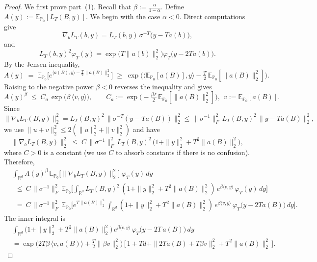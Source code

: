 \documentclass[10pt,a4paper]{amsart}
\newcommand{\E}{\mathbb{E}}
\newcommand{\R}{\mathbb{R}}
\begin{document}
\begin{proof}
We first prove part~(1). Recall that $\beta:=\frac{\alpha}{1-\alpha}.$
Define $A(y):=\E_{\mathbb P_0}[L_T(B,y)].$
We begin with the case $\alpha<0$.
Direct computations give
\[
\nabla_b L_T(b,y)
=
L_T(b,y)\,\sigma^{-T}\!\bigl(y-Ta(b)\bigr),
\]
and
\[
L_T(b,y)^2\varphi_T(y)
=
\exp\!\bigl(T\|a(b)\|_2^2\bigr)
\varphi_T\!\bigl(y-2Ta(b)\bigr).
\]
By the Jensen inequality,
\[
A(y) \;=\; \E_{\mathbb{P}_0}\big[e^{\langle a(B),y\rangle-\frac{T}{2}\|a(B)\|_2^2}\big]
\;\ge\;
\exp\!\Big( \langle \E_{\mathbb{P}_0}[a(B)],y\rangle - \tfrac{T}{2}\,\E_{\mathbb{P}_0}\left[\|a(B)\|_2^2\right] \Big).
\]
Raising to the negative power $\beta<0$ reverses the inequality and gives
\begin{equation}\label{eq:est_A_beta}
A(y)^{\beta}\;\le\;C_a\,\exp\!\big(\beta\,\langle v,y\rangle\big),
\qquad
C_a:=\exp\!\Big(-\tfrac{\beta T}{2}\,\E_{\mathbb{P}_0}\left[\|a(B)\|_2^2\right]\Big),\ \ 
v:=\E_{\mathbb{P}_0}[a(B)].
\end{equation}
Since
\[
\|\nabla_b L_T(B,y)\|_2^2
= L_T(B,y)^2\,\|\sigma^{-T}(y-T a(B))\|_{2}^2
\le \,\|\sigma^{-1}\|_F^2\,L_T(B,y)^2\,\|y-T a(B)\|_2^2,
\] 
we use $\|u+v\|_2^2\le 2(\|u\|_2^2+\|v\|_2^2)$ and have %
\begin{equation*}
\|\nabla_b L_T(B,y)\|_2^2
\;\le\; C\,\|\sigma^{-1}\|_F^2\,L_T(B,y)^2\,\big(1+\|y\|_2^2+T^2\|a(B)\|_2^2\big),
\end{equation*}where $C > 0$ is a constant (we use $C$ to absorb constants if there is no confusion). Therefore,
\[
\begin{aligned}
&\int_{\R^d} A(y)^{\beta}\,\E_{\mathbb{P}_0}\big[\|\nabla_b L_T(B,y)\|_2^2\big]\;\varphi_T(y)\,dy \\
&\ \ \le\ C\,\|\sigma^{-1}\|_F^2\,\E_{\mathbb{P}_0}\!\Big[\int_{\R^d} L_T(B,y)^2\,(1+\|y\|_2^2+T^2\|a(B)\|_2^2)\,e^{\beta\langle v,y\rangle}\,\varphi_T(y)\,dy\Big]\\
&\ \ =\ C\,\|\sigma^{-1}\|_F^2\,\E_{\mathbb{P}_0}\!\Big[e^{T\|a(B)\|_2^2}
\int_{\R^d} (1+\|y\|_2^2+T^2\|a(B)\|_2^2)\,e^{\beta\langle v,y\rangle}\,\varphi_T\!\big(y-2T a(B)\big)\,dy\Big].
\end{aligned}
\]
The inner integral is 
\begin{align*}
    &\int_{\mathbb{R}^d} \bigl(1+\|y\|_2^{2}+T^{2}\|a(B)\|_2^{2}\bigr)\,
e^{\beta\langle v,y\rangle}\,
\varphi_{T}\bigl(y-2T\,a(B)\bigr)\,dy\\
&=
\exp\!\Big(2T\beta\,\langle v,a(B)\rangle + \tfrac{T}{2}\|\beta v\|_2^{2}\Big)\,
\Big[\,1 + T d + \|2T a(B) + T\beta v\|_2^{2} + T^{2}\|a(B)\|_2^{2}\,\Big].

\end{align*}
\end{proof}
\end{document}
